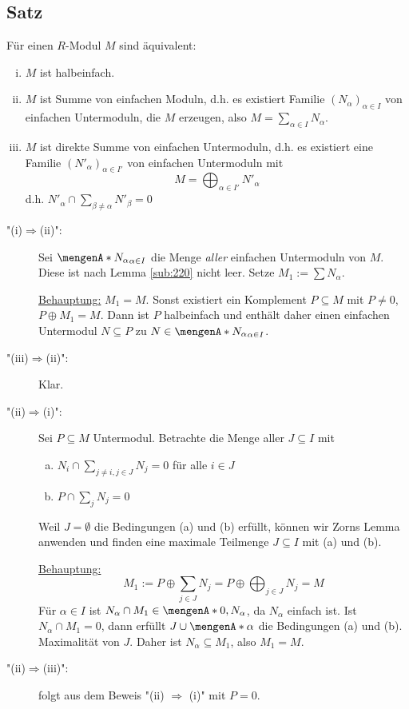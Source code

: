 \subsection[Satz: Äquivalenzen zu halbeinfach durch Summen aus einfachen Untermoduln]{Satz} %
\label{sub:219}
Für einen $R$-Modul $M$ sind äquivalent:
\begin{enumerate}[(i)]
	\item $M$ ist halbeinfach.
	\item $M$ ist Summe von einfachen Moduln, d.h. es existiert Familie $(N_\alpha)_{\alpha \in I}$ von einfachen Untermoduln, die $M$ erzeugen, also 
	$M = \sum_{\alpha \in I} N_\alpha$.
	\item $M$ ist direkte Summe von einfachen Untermoduln, d.h. es existiert eine Familie $(N'_\alpha)_{\alpha \in I'}$ von einfachen Untermoduln mit 
	\[
		M = \bigoplus_{\alpha \in I'} N'_\alpha
	\]
	d.h. $N'_\alpha \cap \sum_{\beta \not= \alpha} N'_\beta = 0$
\end{enumerate}
\begin{description}
	\item["(i)$\Rightarrow$(ii)":] Sei $\set{N_\alpha}_{\alpha\in I}$ die Menge \emph{aller} einfachen Untermoduln von $M$. Diese ist nach Lemma \ref{sub:220} nicht leer. 
	Setze $M_1 := \sum N_\alpha$.
	
	\uline{Behauptung:} $M_1 = M$. Sonst existiert ein Komplement $P \subseteq M$ mit $P \not= 0$, $P \oplus M_1 = M$. Dann ist $P$ halbeinfach und enthält daher einen 
	einfachen Untermodul $N \subseteq P$ \light zu $N \in \set{N_\alpha}_{\alpha \in I}$.
	\item["(iii)$\Rightarrow $(ii)":] Klar.
	\item["(ii)$\Rightarrow $(i)":] Sei $P \subseteq M$ Untermodul. Betrachte die Menge aller $J \subseteq I$ mit 
	\begin{enumerate}[(a)]
		\item $N_i \cap \sum_{j \not= i, j \in J} N_j = 0$ für alle $i \in J$
		\item $P \cap \sum_j N_j = 0$
	\end{enumerate}
	Weil $J = \emptyset$ die Bedingungen (a) und (b) erfüllt, können wir Zorns Lemma anwenden und finden eine maximale Teilmenge $J \subseteq I$ mit (a) und (b).
	
	\uline{Behauptung:} 
	\[
		M_1 := P \oplus \sum_{j \in J} N_j = P \oplus \bigoplus_{j \in J} N_j = M
	\]
	Für $\alpha \in I$ ist $N_\alpha \cap M_1 \in\set{0, N_\alpha}$, da $N_\alpha$ einfach ist. Ist $N_\alpha \cap M_1 = 0$, dann erfüllt $J \cup \set{\alpha}$ die Bedingungen
	(a) und (b). \light Maximalität von $J$. Daher ist $N_\alpha \subseteq M_1$, also $M_1 = M$.
	\item["(ii)$\Rightarrow $(iii)":] folgt aus dem Beweis "(ii) $\Rightarrow$ (i)"{} mit $P=0$. \bewende
\end{description}

